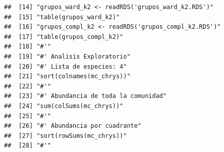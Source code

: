 \documentclass[11pt,]{article}
\begin{document}
\begin{verbatim}
##  [14] "grupos_ward_k2 <- readRDS('grupos_ward_k2.RDS')"                                                                                                                       
##  [15] "table(grupos_ward_k2)"                                                                                                                                                 
##  [16] "grupos_compl_k2 <- readRDS('grupos_compl_k2.RDS')"                                                                                                                     
##  [17] "table(grupos_compl_k2)"                                                                                                                                                
##  [18] "#'"                                                                                                                                                                    
##  [19] "#' Analisis Exploratorio"                                                                                                                                              
##  [20] "#' Lista de especies: 4"                                                                                                                                               
##  [21] "sort(colnames(mc_chrys))"                                                                                                                                              
##  [22] "#'"                                                                                                                                                                    
##  [23] "#' Abundancia de toda la comunidad"                                                                                                                                    
##  [24] "sum(colSums(mc_chrys))"                                                                                                                                                
##  [25] "#'"                                                                                                                                                                    
##  [26] "#' Abundancia por cuadrante"                                                                                                                                           
##  [27] "sort(rowSums(mc_chrys))"                                                                                                                                               
##  [28] "#'"                                                                                                                                                                    

\end{verbatim}
\end{document}
